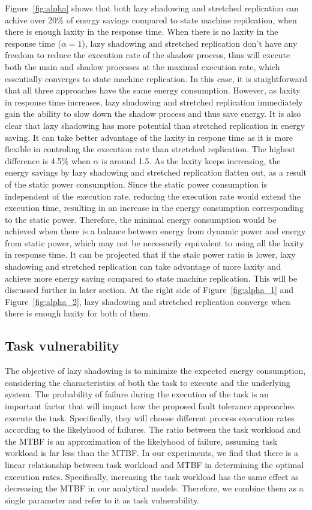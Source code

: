 Figure~\ref{fig:alpha} shows that both lazy shadowing and stretched replication can achive over 20\% of energy savings compared to state machine repilcation, when there is enough laxity in the response time. When there is no laxity in the response time ($\alpha=1$), lazy shadowing and stretched replication don't have any freedom to reduce the execution rate of the shadow process, thus will execute both the main and shadow processes at the maximal execution rate, which essentially converges to state machine replication. In this case, it is staightforward that all three approaches have the same energy consumption. However, as laxity in response time increases, lazy shadowing and stretched replication immediately gain the ability to slow down the shadow process and thus save energy. It is also clear that laxy shadowing has more potential than stretched replication in energy saving. It can take better advantage of the laxity in respone time as it is more flexible in controling the execution rate than stretched replication. The highest difference is 4.5\% when $\alpha$ is around 1.5. As the laxity keeps increasing, the energy savings by lazy shadowing and stretched replication flatten out, as a result of the static power consumption. Since the static power consumption is independent of the execution rate, reducing the execution rate would extend the execution time, resulting in an increase in the energy consumption corresponding to the static power. Therefore, the minimal energy consumption would be achieved when there is a balance between energy from dynamic power and energy from static power, which may not be necessarily equivalent to using all the laxity in response time. It can be projected that if the staic power ratio is lower, laxy shadowing and stretched replication can take advantage of more laxity and achieve more energy saving compared to state machine replication. This will be discussed further in later section. At the right side of Figure~\ref{fig:alpha_1} and Figure~\ref{fig:alpha_2}, lazy shadowing and stretched replication converge when there is enough laxity for both of them. 

\subsection{Task vulnerability}
The objective of lazy shadowing is to minimize the expected energy consumption, considering the characteristics of both the task to execute and the underlying system. The probability of failure during the execution of the task is an important factor that will impact how the proposed fault tolerance approaches execute the task. Specifically, they will choose different process execution rates according to the likelyhood of failures. The ratio between the task workload and the MTBF is an approximation of the likelyhood of failure, assuming task workload is far less than the MTBF. In our experiments, we find that there is a linear relationship between task workload and MTBF in determining the optimal execution rates. Specifically, increasing the task workload has the same effect as decreasing the MTBF in our analytical models. Therefore, we combine them as a single parameter and refer to it as task vulnerability.

